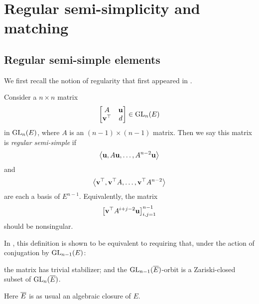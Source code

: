 \chapter{Regular semi-simplicity and matching}
\label{ch:rs_matching}

\section{Regular semi-simple elements}
We first recall the notion of regularity
that first appeared in \cite[\S6]{ref:multoneconj}.

\begin{definition}
  \label{def:rs}
  Consider a $n \times n$ matrix
  \[ \begin{bmatrix} A & \mathbf u \\ \mathbf v^\top & d \end{bmatrix} \in \operatorname{GL}_n(E) \]
  in $\operatorname{GL}_n(E)$, where $A$ is an $(n-1) \times (n-1)$ matrix.
  Then we say this matrix is \emph{regular semi-simple} if
  \[ \left< \mathbf u, A\mathbf u, \dots, A^{n-2}\mathbf u \right> \]
  and \[ \left< \mathbf v^\top, \mathbf v^\top A, \dots, \mathbf v^\top A^{n-2} \right> \]
  are each a basis of $E^{n-1}$.
  Equivalently, the matrix
  \[ \left[ \mathbf v^\top A^{i+j-2} \mathbf u \right]_{i,j=1}^{n-1} \]
  should be nonsingular.
\end{definition}

\begin{remark}
  In \cite[Theorem 6.1]{ref:multoneconj}, this definition is shown to be equivalent to
  requiring that, under the action of conjugation by $\operatorname{GL}_{n-1}(E)$:
  \begin{itemize}
  \ii the matrix has trivial stabilizer; and
  \ii the $\operatorname{GL}_{n-1}(\overline E)$-orbit is a Zariski-closed subset of $\operatorname{GL}_n(\overline E)$.
  \end{itemize}
  Here $\overline E$ is as usual an algebraic closure of $E$.
\end{remark}

